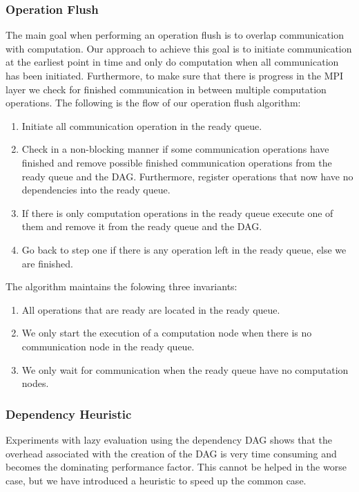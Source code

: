 \documentclass[preprint]{../PGAS10/sigplanconf}
\begin{document}
\subsubsection{Operation Flush}
The main goal when performing an operation flush is to overlap communication with computation. Our approach to achieve this goal is to initiate communication at the earliest point in time and only do computation when all communication has been initiated. Furthermore, to make sure that there is progress in the MPI layer we check for finished communication in between multiple computation operations. The following is the flow of our operation flush algorithm:
\begin{enumerate}
\item Initiate all communication operation in the ready queue.
\item Check in a non-blocking manner if some communication operations have finished and remove possible finished communication operations from the ready queue and the DAG. Furthermore, register operations that now have no dependencies into the ready queue.
\item If there is only computation operations in the ready queue execute one of them and remove it from the ready queue and the DAG.
\item Go back to step one if there is any operation left in the ready queue, else we are finished.
\end{enumerate}
The algorithm maintains the folowing three invariants:
\begin{enumerate}
\item All operations that are ready are located in the ready queue.
\item We only start the execution of a computation node when there is no communication node in the ready queue.
\item We only wait for communication when the ready queue have no computation nodes.
\end{enumerate}



\subsubsection{Dependency Heuristic}
Experiments with lazy evaluation using the dependency DAG shows that the overhead associated with the creation of the DAG is very time consuming and becomes the dominating performance factor. This cannot be helped in the worse case, but we have introduced a heuristic to speed up the common case. 
\end{document}
